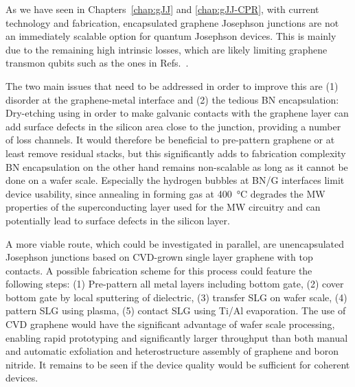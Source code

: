 

As we have seen in Chapters~\ref{chap:gJJ} and \ref{chap:gJJ-CPR}, with current technology and fabrication, encapsulated graphene Josephson junctions are not an immediately scalable option for quantum Josephson devices.
%
This is mainly due to the remaining high intrinsic losses, which are likely limiting graphene transmon qubits such as the ones in Refs.~\cite{krollMagneticFieldCompatible2018,wangCoherentControlHybrid2019}.

The two main issues that need to be addressed in order to improve this are (1) disorder at the graphene-metal interface and (2) the tedious BN encapsulation:
Dry-etching using  in order to make galvanic contacts with the graphene layer can add surface defects in the silicon area close to the junction, providing a number of loss channels.
%
It would therefore be beneficial to pre-pattern graphene or at least remove residual stacks, but this significantly adds to fabrication complexity
%
BN encapsulation on the other hand remains non-scalable as long as it cannot be done on a wafer scale.
%
Especially the hydrogen bubbles at BN/G interfaces limit device usability, since annealing in forming gas at \SI{400}{\celsius} degrades the MW properties of the superconducting layer used for the MW circuitry and can potentially lead to surface defects in the silicon layer.

A more viable route, which could be investigated in parallel, are unencapsulated Josephson junctions based on CVD-grown single layer graphene with top contacts.
%
A possible fabrication scheme for this process could feature the following steps:
%
(1) Pre-pattern all metal layers including bottom gate, (2) cover bottom gate by local sputtering of dielectric, (3) transfer SLG on wafer scale, (4) pattern SLG using  plasma, (5) contact SLG using Ti/Al evaporation.
%
The use of CVD graphene would have the significant advantage of wafer scale processing, enabling rapid prototyping and significantly larger throughput than both manual and automatic exfoliation and heterostructure assembly of graphene and boron nitride.
%
It remains to be seen if the device quality would be sufficient for coherent devices.

